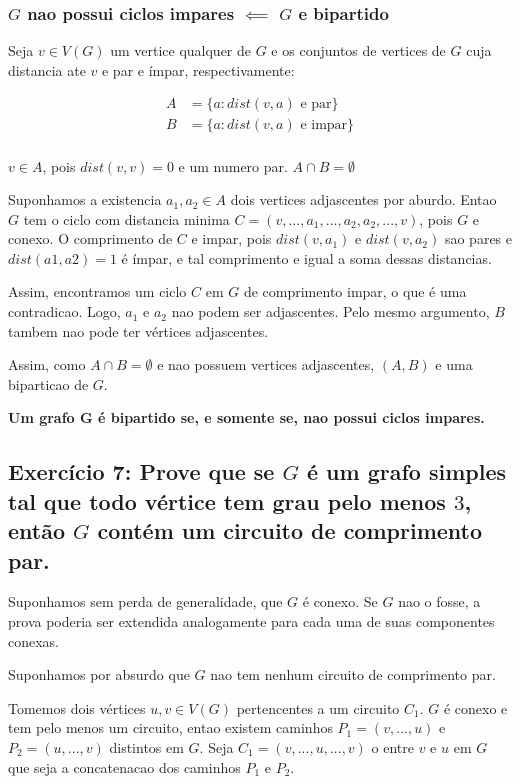 \documentclass{article}
\begin{document}
\subsubsection{$G$ nao possui ciclos impares $\impliedby$ $G$ e bipartido}

Seja $v \in V(G)$  um vertice qualquer de $G$ e os conjuntos de vertices de $G$ cuja distancia ate $v$ e par e ímpar, respectivamente:

 \begin{align}
	A &= \{a : dist(v,a) \text{   e par}\} \\
	B&= \{a : dist(v,a) \text{   e impar}\} \\
\end{align}


$v \in A$, pois $dist(v,v) = 0$ e um numero par.
$A \cap B = \emptyset$

Suponhamos a existencia $a_1, a_2 \in A$ dois vertices adjascentes por aburdo. Entao $G$ tem o ciclo com distancia minima $C = (v, ..., a_1, ... ,a_2, a_2,...,v)$, pois $G$ e conexo. O comprimento de $C$ e impar, pois $dist(v, a_1)$ e $dist(v,a_2)$ sao pares e $dist(a1,a2) = 1$ é ímpar, e tal comprimento e igual a soma dessas distancias.

Assim, encontramos um ciclo $C$ em $G$ de comprimento impar, o que é uma contradicao. Logo, $a_1$ e $a_2$ nao podem ser adjascentes.
Pelo mesmo argumento, $B$ tambem nao pode ter vértices adjascentes.

Assim, como $A \cap B = \emptyset$ e nao possuem vertices adjascentes, $(A, B)$ e uma biparticao de $G$.

\textbf{Um grafo G é bipartido se, e somente se, nao possui ciclos impares.}

\clearpage

\subsection{Exercício 7: Prove que se $G$ é um grafo simples tal que todo vértice tem grau pelo menos $3$, então $G$ contém um circuito de comprimento par.}


Suponhamos sem perda de generalidade, que $G$ é conexo. Se $G$ nao o fosse, a prova poderia ser extendida analogamente para cada uma de suas componentes conexas.

Suponhamos por absurdo que $G$ nao tem nenhum circuito de comprimento par.

Tomemos dois vértices $u, v \in V(G)$ pertencentes a um circuito $C_1$. $G$ é conexo e tem pelo menos um circuito, entao existem caminhos $P_1 = (v, ..., u)$  e $P_2 = (u, ...,v)$ distintos em $G$. Seja $C_1 = (v, ..., u, ...,v)$ o entre $v$ e $u$ em $G$ que seja a concatenacao  dos caminhos $P_1$ e $P_2$.
\end{document}

